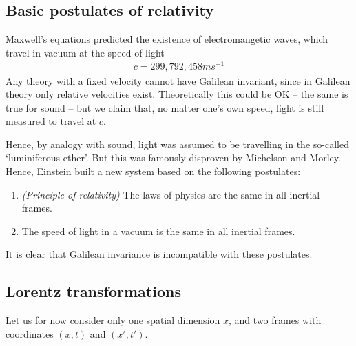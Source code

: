 \documentclass{../template/note}
\begin{document}
    \subsection{Basic postulates of relativity}

    Maxwell's equations predicted the existence of electromangetic waves, which travel in vacuum at the speed of light
    \begin{align*}
        c = 299,792,458 \si{ms^{-1}}
    \end{align*}
    Any theory with a fixed velocity cannot have Galilean invariant, since in Galilean theory only relative velocities exist. Theoretically this could be OK -- the same is true for sound -- but we claim that, no matter one's own speed, light is still measured to travel at \(c\).

    Hence, by analogy with sound, light was assumed to be travelling in the so-called `luminiferous ether'. But this was famously disproven by Michelson and Morley. Hence, Einstein built a new system based on the following postulates:
    \begin{enumerate}[label=\protect\circled{\arabic*}]
        \item \emph{(Principle of relativity)} The laws of physics are the same in all inertial frames.
        \item The speed of light in a vacuum is the same in all inertial frames.
    \end{enumerate}

    It is clear that Galilean invariance is incompatible with these postulates.

    \subsection{Lorentz transformations}

    Let us for now consider only one spatial dimension \(x\), and two frames with coordinates \((x, t)\) and \((x', t')\).
\end{document}
